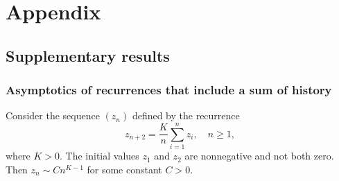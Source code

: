 \appendix
\chapter[Appendix]{Appendix}

\section{Supplementary results}

\subsection{Asymptotics of recurrences that include a sum of history}
\label{subsec:asymptotics-of-recurrences-that-include-a-sum-of-history}

\begin{proposition}
  \label{lem:full-history-sum-asymptotics}
  Consider the sequence $(z_n)$ defined by the recurrence
  \begin{equation}
    \label{eq:full-history-sum-recurrence}
    z_{n+2} = \dfrac{K}{n}\sum\limits_{i=1}^n z_{i}, \quad n \ge 1,
  \end{equation}
  where $K > 0$. The initial values $z_1$ and $z_2$ are nonnegative and not both zero. Then $z_n\sim Cn^{K-1}$ for some constant $C > 0$.
\end{proposition}

